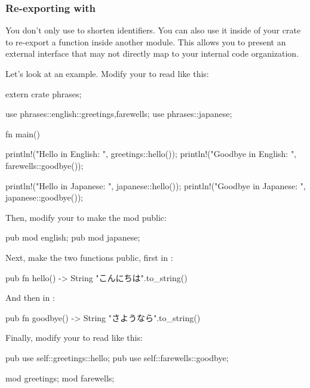 \subsubsection*{Re-exporting with }

You don't only use  to shorten identifiers. You can also use it inside of your crate to re-export a function inside another 
module. This allows you to present an external interface that may not directly map to your internal code organization.

\blank

Let's look at an example. Modify your  to read like this:

\begin{rustc}
extern crate phrases;

use phrases::english::{greetings,farewells};
use phrases::japanese;

fn main() {
    println!("Hello in English: {}", greetings::hello());
    println!("Goodbye in English: {}", farewells::goodbye());

    println!("Hello in Japanese: {}", japanese::hello());
    println!("Goodbye in Japanese: {}", japanese::goodbye());
}
\end{rustc}

Then, modify your  to make the  mod public:

\begin{rustc}
pub mod english;
pub mod japanese;
\end{rustc}

Next, make the two functions public, first in :

\begin{rustc}
pub fn hello() -> String {
    "こんにちは".to_string()
}
\end{rustc}

And then in :

\begin{rustc}
pub fn goodbye() -> String {
    "さようなら".to_string()
}
\end{rustc}

Finally, modify your  to read like this:

\begin{rustc}
pub use self::greetings::hello;
pub use self::farewells::goodbye;

mod greetings;
mod farewells;
\end{rustc}

